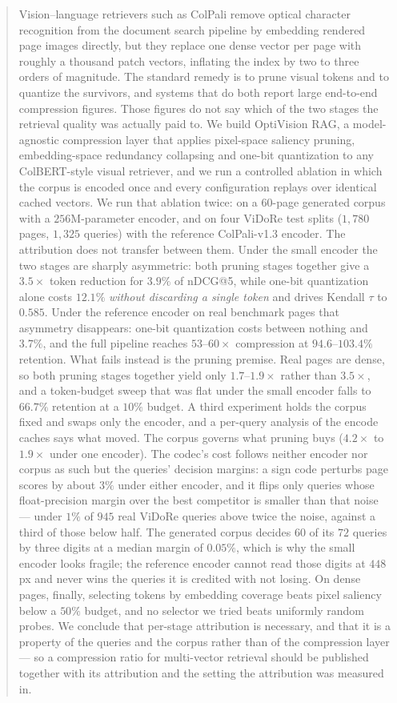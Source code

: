 \documentclass[conference]{IEEEtran}
\begin{document}
\begin{abstract}
Vision--language retrievers such as ColPali remove optical character
recognition from the document search pipeline by embedding rendered page images
directly, but they replace one dense vector per page with roughly a thousand
patch vectors, inflating the index by two to three orders of magnitude. The
standard remedy is to prune visual tokens and to quantize the survivors, and
systems that do both report large end-to-end compression figures. Those figures
do not say which of the two stages the retrieval quality was actually paid to.
We build OptiVision RAG, a model-agnostic compression layer that applies
pixel-space saliency pruning, embedding-space redundancy collapsing and
one-bit quantization to any ColBERT-style visual retriever, and we run a
controlled ablation in which the corpus is encoded once and every configuration
replays over identical cached vectors.
We run that ablation twice: on a $60$-page generated corpus with a
$256$M-parameter encoder, and on four ViDoRe test splits ($1{,}780$ pages,
$1{,}325$ queries) with the reference ColPali-v1.3 encoder. The attribution does
not transfer between them. Under the small encoder the two stages are sharply
asymmetric: both pruning stages together give a $3.5\times$ token reduction for
$3.9\%$ of nDCG@5, while one-bit quantization alone costs $12.1\%$
\emph{without discarding a single token} and drives Kendall $\tau$ to $0.585$.
Under the reference encoder on real benchmark pages that asymmetry disappears:
one-bit quantization costs between nothing and $3.7\%$, and the full pipeline
reaches $53$--$60\times$ compression at $94.6$--$103.4\%$ retention. What fails
instead is the pruning premise. Real pages are dense, so both pruning stages
together yield only $1.7$--$1.9\times$ rather than $3.5\times$, and a
token-budget sweep that was flat under the small encoder falls to $66.7\%$
retention at a $10\%$ budget. A third experiment holds the corpus fixed and swaps only the
encoder, and a per-query analysis of the encode caches says what moved. The
corpus governs what pruning buys ($4.2\times$ to $1.9\times$ under one encoder).
The codec's cost follows neither encoder nor corpus as such but the queries'
decision margins: a sign code perturbs page scores by about $3\%$ under either
encoder, and it flips only queries whose float-precision margin over the
best competitor is smaller than that noise --- under $1\%$ of $945$ real ViDoRe
queries above twice the noise, against a third of those below half. The generated corpus decides $60$ of its $72$ queries by three digits at
a median margin of $0.05\%$, which is why the small encoder looks fragile; the
reference encoder cannot read those digits at $448$\,px and never wins the
queries it is credited with not losing. On dense pages, finally, selecting
tokens by embedding coverage beats pixel saliency below a $50\%$ budget, and no
selector we tried beats uniformly random probes. We conclude that per-stage
attribution is necessary, and that it is a property of the queries and the
corpus rather than of the compression layer --- so a compression ratio for
multi-vector retrieval should be published together with its attribution and the
setting the attribution was measured in.
\end{abstract}
\end{document}
